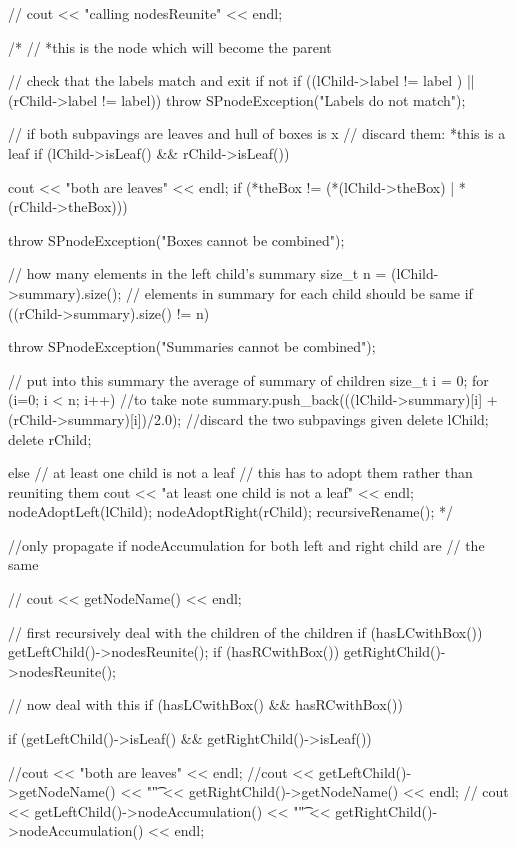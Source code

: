 \begin{DoxyCode}
    {
      //  cout << "calling nodesReunite" << endl;
     
     /*
      // *this is the node which will become the parent
        
      // check that the labels match and exit if not
        if ((lChild->label != label ) || (rChild->label != label)) {
            throw SPnodeException("Labels do not match");
        }
      
        // if both subpavings are leaves and hull of boxes is x
        // discard them: *this is a leaf
        if (lChild->isLeaf() && rChild->isLeaf()) {
        cout << "both are leaves" << endl;
         if (*theBox != (*(lChild->theBox) |
                            *(rChild->theBox))) {
                throw SPnodeException("Boxes cannot be combined");

            }               
        // how many elements in the left child's summary
            size_t n = (lChild->summary).size();
            // elements in summary for each child should be same
            if ((rChild->summary).size() != n) {
                throw SPnodeException("Summaries cannot be combined");

            }
            // put into this summary the average of summary of children
            size_t i = 0;
        for (i=0; i < n; i++) {
           //to take note
                summary.push_back(((lChild->summary)[i]
                                +(rChild->summary)[i])/2.0);
            }   
            //discard the two subpavings given
        delete lChild;
            delete rChild;
        }

        else {  // at least one child is not a leaf
            // this has to adopt them rather than reuniting them
        cout << "at least one child is not a leaf" << endl;
            nodeAdoptLeft(lChild);
            nodeAdoptRight(rChild);
            recursiveRename();
        }
      */
      
      //only propagate if nodeAccumulation for both left and right child are
      // the same
      
     // cout << getNodeName() << endl;
  
      // first recursively deal with the children of the children           
       if (hasLCwithBox())
            getLeftChild()->nodesReunite();
        if (hasRCwithBox())
            getRightChild()->nodesReunite();

      // now deal with this
      if (hasLCwithBox() && hasRCwithBox()) {
            if (getLeftChild()->isLeaf() && getRightChild()->isLeaf()) {
          //cout << "both are leaves" << endl;
          //cout << getLeftChild()->getNodeName() << "\t" <<
       getRightChild()->getNodeName() << endl;
        //  cout << getLeftChild()->nodeAccumulation() << "\t" <<
       getRightChild()->nodeAccumulation() << endl;
          
}}}
\end{DoxyCode}
